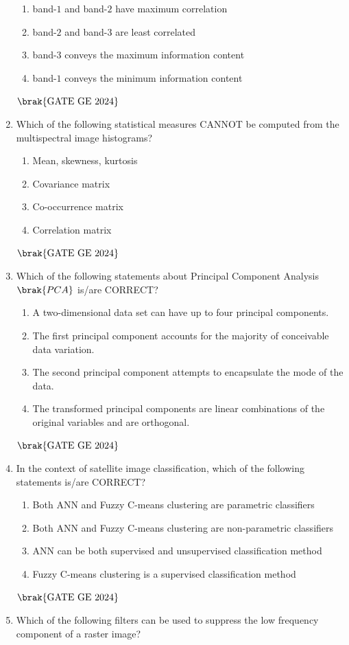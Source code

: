 \documentclass[journal,12pt,onecolumn]{IEEEtran}
\theoremstyle{remark}
\begin{document}
\begin{enumerate}
\begin{enumerate}
\item band-$1$ and band-$2$ have maximum correlation
\item band-$2$ and band-$3$ are least correlated
\item band-$3$ conveys the maximum information content
\item band-$1$ conveys the minimum information content
\end{enumerate}
\hfill $\brak{\text{GATE GE 2024}}$
\bigskip
\item Which of the following statistical measures CANNOT be computed from the multispectral image histograms?
\begin{enumerate}
\item Mean, skewness, kurtosis
\item Covariance matrix
\item Co-occurrence matrix
\item Correlation matrix
\end{enumerate}
\hfill $\brak{\text{GATE GE 2024}}$
\bigskip
\item Which of the following statements about Principal Component Analysis $\brak{PCA}$ is/are CORRECT?
\begin{enumerate}
\item A two-dimensional data set can have up to four principal components.
\item The first principal component accounts for the majority of conceivable data variation.
\item The second principal component attempts to encapsulate the mode of the data.
\item The transformed principal components are linear combinations of the original variables and are orthogonal.
\end{enumerate}
\hfill $\brak{\text{GATE GE 2024}}$
\bigskip
\item In the context of satellite image classification, which of the following statements is/are CORRECT?
\begin{enumerate}
\item Both ANN and Fuzzy C-means clustering are parametric classifiers
\item Both ANN and Fuzzy C-means clustering are non-parametric classifiers
\item ANN can be both supervised and unsupervised classification method
\item Fuzzy C-means clustering is a supervised classification method
\end{enumerate}
\hfill $\brak{\text{GATE GE 2024}}$
\bigskip
\item Which of the following filters can be used to suppress the low frequency component of a raster image?
\begin{center}


\end{center}
\end{enumerate}
\end{document}
